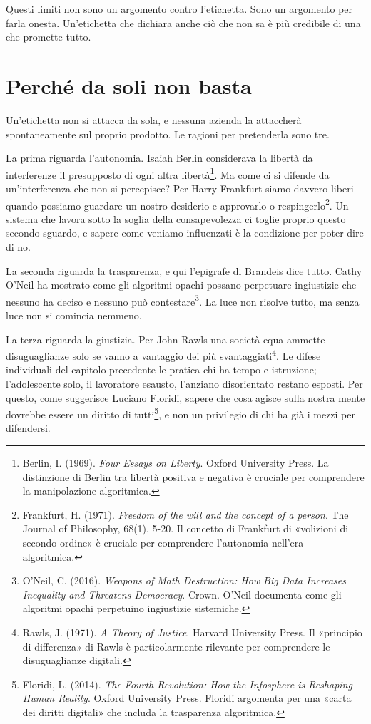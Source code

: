 Questi limiti non sono un argomento contro l'etichetta. Sono un argomento per farla onesta. Un'etichetta che dichiara anche ciò che non sa è più credibile di una che promette tutto.

\section{Perché da soli non basta}
\label{sec:p4c31-tre-principi-per}
Un'etichetta non si attacca da sola, e nessuna azienda la attaccherà spontaneamente sul proprio prodotto. Le ragioni per pretenderla sono tre.

La prima riguarda l'autonomia. Isaiah Berlin considerava la libertà da interferenze il presupposto di ogni altra libertà\footnote{Berlin, I. (1969). \textit{Four Essays on Liberty}. Oxford University Press. La distinzione di Berlin tra libertà positiva e negativa è cruciale per comprendere la manipolazione algoritmica.}. Ma come ci si difende da un'interferenza che non si percepisce? Per Harry Frankfurt siamo davvero liberi quando possiamo guardare un nostro desiderio e approvarlo o respingerlo\footnote{Frankfurt, H. (1971). \textit{Freedom of the will and the concept of a person}. The Journal of Philosophy, 68(1), 5-20. Il concetto di Frankfurt di «volizioni di secondo ordine» è cruciale per comprendere l'autonomia nell'era algoritmica.}. Un sistema che lavora sotto la soglia della consapevolezza ci toglie proprio questo secondo sguardo, e sapere come veniamo influenzati è la condizione per poter dire di no.

La seconda riguarda la trasparenza, e qui l'epigrafe di Brandeis dice tutto. Cathy O'Neil ha mostrato come gli algoritmi opachi possano perpetuare ingiustizie che nessuno ha deciso e nessuno può contestare\footnote{O'Neil, C. (2016). \textit{Weapons of Math Destruction: How Big Data Increases Inequality and Threatens Democracy}. Crown. O'Neil documenta come gli algoritmi opachi perpetuino ingiustizie sistemiche.}. La luce non risolve tutto, ma senza luce non si comincia nemmeno.

La terza riguarda la giustizia. Per John Rawls una società equa ammette disuguaglianze solo se vanno a vantaggio dei più svantaggiati\footnote{Rawls, J. (1971). \textit{A Theory of Justice}. Harvard University Press. Il «principio di differenza» di Rawls è particolarmente rilevante per comprendere le disuguaglianze digitali.}. Le difese individuali del capitolo precedente le pratica chi ha tempo e istruzione; l'adolescente solo, il lavoratore esausto, l'anziano disorientato restano esposti. Per questo, come suggerisce Luciano Floridi, sapere che cosa agisce sulla nostra mente dovrebbe essere un diritto di tutti\footnote{Floridi, L. (2014). \textit{The Fourth Revolution: How the Infosphere is Reshaping Human Reality}. Oxford University Press. Floridi argomenta per una «carta dei diritti digitali» che includa la trasparenza algoritmica.}, e non un privilegio di chi ha già i mezzi per difendersi.


